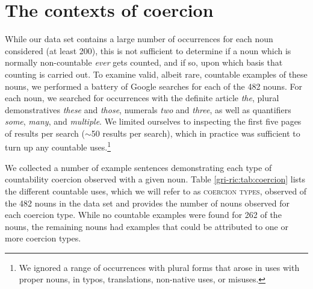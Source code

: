 \documentclass[output=paper]{langscibook}
\begin{document}


\section{The contexts of coercion} \label{gri-ric:sec:coercion}

While our data set contains a large number of occurrences for each noun considered (at least 200), this is not sufficient to determine if a noun which is normally non-countable \textit{ever} gets counted, and if so, upon which basis that counting is carried out.  To examine valid, albeit rare, countable examples of these nouns, we performed a battery of Google searches for each  of the 482 nouns. For each noun, we searched for occurrences with the definite article \emph{the}, plural demonstratives \emph{these} and \emph{those}, numerals \emph{two} and \emph{three}, as well as quantifiers \emph{some}, \emph{many}, and \emph{multiple}. We limited ourselves to inspecting the first five pages of results per search ($\sim$50 results per search), which in practice was sufficient to turn up any countable uses.\footnote{We ignored  a range of occurrences with plural forms that arose in uses with proper nouns, in typos, translations, non-native uses, or misuses.} 

\begin{sloppypar}
We collected a number of example sentences demonstrating each type of countability coercion observed with a given noun. Table \ref{gri-ric:tab:coercion} lists the different countable uses, which we will refer to as \textsc{coercion types}, observed of the 482 nouns in the data set and provides the number of nouns observed for each coercion type. While no countable examples were found for 262 of the nouns, the remaining nouns had examples that could be attributed to one or more coercion types.
\end{sloppypar}
\end{document}
